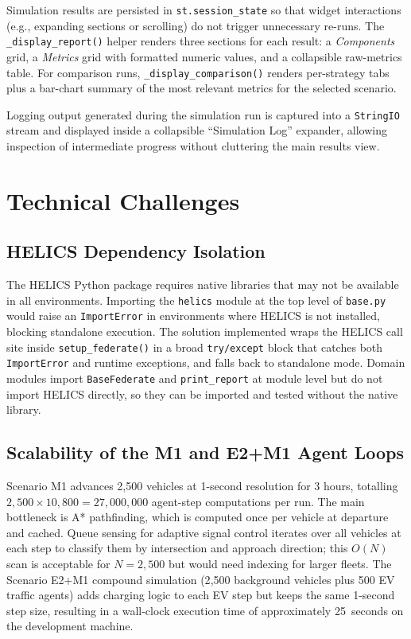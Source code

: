 Simulation results are persisted in \texttt{st.session\_state} so that widget interactions (e.g., expanding sections or scrolling) do not trigger unnecessary re-runs. The \texttt{\_display\_report()} helper renders three sections for each result: a \emph{Components} grid, a \emph{Metrics} grid with formatted numeric values, and a collapsible raw-metrics table. For comparison runs, \texttt{\_display\_comparison()} renders per-strategy tabs plus a bar-chart summary of the most relevant metrics for the selected scenario.

Logging output generated during the simulation run is captured into a \texttt{StringIO} stream and displayed inside a collapsible ``Simulation Log'' expander, allowing inspection of intermediate progress without cluttering the main results view.


\section{Technical Challenges}

\subsection{HELICS Dependency Isolation}

The HELICS Python package requires native libraries that may not be available in all environments. Importing the \texttt{helics} module at the top level of \texttt{base.py} would raise an \texttt{ImportError} in environments where HELICS is not installed, blocking standalone execution. The solution implemented wraps the HELICS call site inside \texttt{setup\_federate()} in a broad \texttt{try/except} block that catches both \texttt{ImportError} and runtime exceptions, and falls back to standalone mode. Domain modules import \texttt{BaseFederate} and \texttt{print\_report} at module level but do not import HELICS directly, so they can be imported and tested without the native library.

\subsection{Scalability of the M1 and E2+M1 Agent Loops}

Scenario M1 advances 2{,}500 vehicles at 1-second resolution for 3 hours, totalling $2{,}500 \times 10{,}800 = 27{,}000{,}000$ agent-step computations per run. The main bottleneck is A* pathfinding, which is computed once per vehicle at departure and cached. Queue sensing for adaptive signal control iterates over all vehicles at each step to classify them by intersection and approach direction; this $O(N)$ scan is acceptable for $N = 2{,}500$ but would need indexing for larger fleets. The Scenario E2+M1 compound simulation (2{,}500 background vehicles plus 500 EV traffic agents) adds charging logic to each EV step but keeps the same 1-second step size, resulting in a wall-clock execution time of approximately 25~seconds on the development machine.

